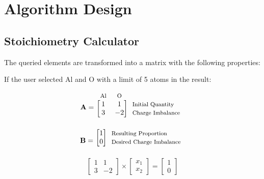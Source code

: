 \section{Algorithm Design}
\subsection{Stoichiometry Calculator}
The queried elements are transformed into a matrix with the following properties:

\pagebreak
\begin{center}
	If the user selected Al and O with a limit of 5 atoms in the result:
\end{center}
\begin{equation*}
	\mathbf{A}=
	\begin{blockarray}{*{2}{c} l}
		\begin{block}{*{2}{>{$\footnotesize}c<{$}} l}
			Al & O  \\
		\end{block}
		\begin{block}{[*{2}{c}]>{$\footnotesize}l<{$}}
			1 & 1 & Initial Quantity \\
			3 & -2 & Charge Imbalance \\
		\end{block}
	\end{blockarray}
\end{equation*}
\begin{equation*}
	\mathbf{B}=
		\begin{blockarray}{*{1}{c} l}
		\begin{block}{[*{1}{c}]>{$\footnotesize}l<{$}}
			1 &  Resulting Proportion \\
			0 &  Desired Charge Imbalance \\
		\end{block}
	\end{blockarray}
\end{equation*}
\begin{equation*}
	\begin{bmatrix}
	1 & 1 \\
	3 & -2
	\end{bmatrix}
	\times
	\begin{bmatrix}
	x_1 \\
	x_2
	\end{bmatrix}
	=
	\begin{bmatrix}
	1 \\
	0 
	\end{bmatrix}
\end{equation*}

